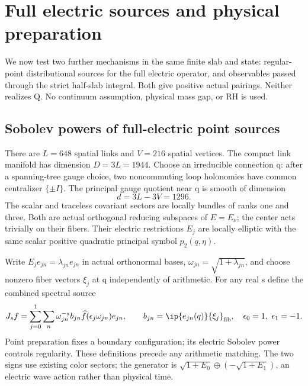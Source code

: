 \section{Full electric sources and physical preparation}\label{sec:full-electric-preparation}
We now test two further mechanisms in the same finite slab and
state: regular-point distributional sources for the full electric
operator, and observables passed through the strict half-slab
integral. Both give positive actual pairings. Neither realizes Q.
No continuum assumption, physical mass gap, or RH is used.

\subsection{Sobolev powers of full-electric point sources}
There are $L=648$ spatial links and $V=216$ spatial vertices.
The compact link manifold has dimension $D=3L=1944$.
Choose an irreducible connection q: after a spanning-tree gauge
choice, two noncommuting loop holonomies have common centralizer
$\{\pm I\}$. The principal gauge quotient near q is smooth of
dimension
\begin{equation}\label{eq:quotient-dimension}
d=3L-3V=1296.
\end{equation}
The scalar and traceless covariant sectors are locally bundles of
ranks one and three. Both are actual orthogonal reducing subspaces
of $E=E_\nu$; the center acts trivially on their fibers. Their
electric restrictions $E_j$ are locally elliptic with the same
scalar positive quadratic principal symbol $p_2(q,\eta)$.

Write $E_je_{jn}=\lambda_{jn}e_{jn}$ in actual orthonormal bases,
$\omega_{jn}=\sqrt{1+\lambda_{jn}}$, and choose nonzero fiber
vectors $\xi_j$ at q independently of arithmetic. For any real s
define the combined spectral source
\begin{equation}\label{eq:full-point-source}
J_sf=\sum_{j=0}^1\sum_n\omega_{jn}^{-s}b_{jn}
 \widehat f(\epsilon_j\omega_{jn})e_{jn},\qquad
b_{jn}=\ip{e_{jn}(q)}{\xi_j}_{\rm fib},\quad
\epsilon_0=1,\ \epsilon_1=-1.
\end{equation}
Point preparation fixes a boundary configuration; its electric
Sobolev power controls regularity. These definitions precede any
arithmetic matching. The two signs use existing color sectors;
the generator is $\sqrt{1+E_0}\oplus(-\sqrt{1+E_1})$, an electric
wave action rather than physical time.

